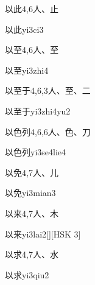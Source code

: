 \begin{entry}{以此}{4,6}{⼈、⽌}
  \begin{phonetics}{以此}{yi3ci3}
  \end{phonetics}
\end{entry}

\begin{entry}{以至}{4,6}{⼈、⾄}
  \begin{phonetics}{以至}{yi3zhi4}
  \end{phonetics}
\end{entry}

\begin{entry}{以至于}{4,6,3}{⼈、⾄、⼆}
  \begin{phonetics}{以至于}{yi3zhi4yu2}
  \end{phonetics}
\end{entry}

\begin{entry}{以色列}{4,6,6}{⼈、⾊、⼑}
  \begin{phonetics}{以色列}{yi3se4lie4}
  \end{phonetics}
\end{entry}

\begin{entry}{以免}{4,7}{⼈、⼉}
  \begin{phonetics}{以免}{yi3mian3}
  \end{phonetics}
\end{entry}

\begin{entry}{以来}{4,7}{⼈、⽊}
  \begin{phonetics}{以来}{yi3lai2}[][HSK 3]
  \end{phonetics}
\end{entry}

\begin{entry}{以求}{4,7}{⼈、⽔}
  \begin{phonetics}{以求}{yi3qiu2}
  \end{phonetics}
\end{entry}

